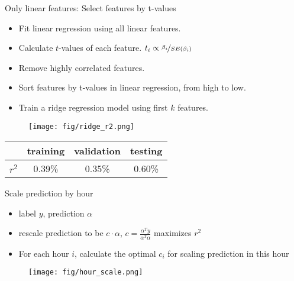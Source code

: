 \documentclass[9pt]{beamer}
\begin{document}
\begin{frame}{ Only linear features: Select features by t-values}

\begin{itemize}
    \item Fit linear regression using all linear features.
    \item Calculate $t$-values of each feature. $t_i\propto \nicefrac{\beta_i}{SE(\beta_i)}$
    \item Remove highly correlated features.
    \item Sort features by t-values in linear regression, from high to low.
    \item Train a ridge regression model using first $k$ features.
\end{itemize}
\begin{figure}
    \centering
    \texttt{[image: fig/ridge\_r2.png]}
\end{figure}


\begin{table}[h!]
\centering
\begin{tabular}{c|c|c|c}
\hline
 & \textbf{training} & \textbf{validation} & \textbf{testing} \\ \hline
$r^2$      & 0.39\%      & 0.35\%     & 0.60\%      \\ \hline
\end{tabular}
\end{table}


\end{frame}


\begin{frame}{Scale prediction by hour}



\begin{itemize}
	\item label $y$, prediction $\alpha$
	\item rescale prediction to be $c\cdot \alpha$, $c=\frac{\alpha^T y}{\alpha^T \alpha}$ maximizes $r^2$
    \item For each hour $i$, calculate the optimal $c_i$ for scaling prediction in this hour
\end{itemize}

\begin{figure}
    \centering
    \texttt{[image: fig/hour\_scale.png]}
\end{figure}



\end{frame}
\end{document}
